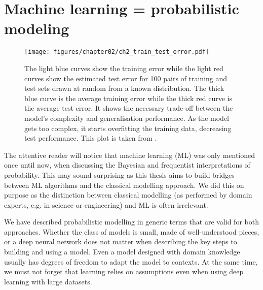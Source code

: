 \section{Machine learning = probabilistic modeling}
\begin{figure}
  \centering
  \texttt{[image: figures/chapter02/ch2\_train\_test\_error.pdf]}
  \caption{The light blue curves show the training error while the
  light red curves show the estimated test error for 100
  pairs of training and test sets drawn at random
  from a known distribution. The thick blue curve is the average
  training error while the thick red curve is the average test error.
  It shows the necessary trade-off between the model's complexity and generalisation performance. As the model gets too complex, it starts overfitting the training data, decreasing test performance. This plot is taken from \citet{louppe2014understanding}.}
  \label{fig:ch02:learning_curves}
\end{figure}
The attentive reader will notice that machine learning (ML) was only mentioned once until now, when discussing the Bayesian and frequentist interpretations of probability.
This may sound surprising as this thesis aims to build bridges between ML algorithms and the classical modelling approach. We did this on purpose as the distinction between classical modelling (as performed by domain experts, e.g. in science or engineering) and ML is often irrelevant.

We have described probabilistic modelling in generic terms that are valid for both approaches. Whether the class of models is small, made of well-understood pieces, or a deep neural network does not matter when describing the key steps to building and using a model. Even a model designed with domain knowledge usually has degrees of freedom to adapt the model to contexts. At the same time, we must not forget that learning relies on assumptions even when using deep learning with large datasets.

